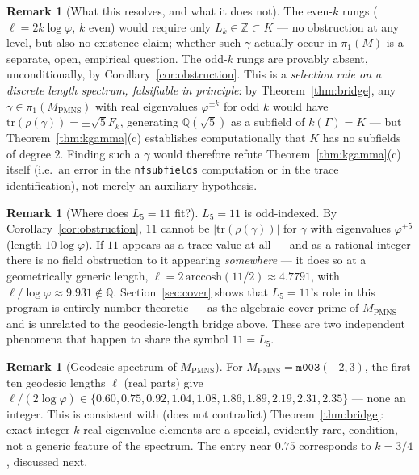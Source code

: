 \documentclass[12pt]{article}
\theoremstyle{definition}
\newtheorem{remark}[theorem]{Remark}
\newcommand{\Z}{\mathbb{Z}}
\newcommand{\Q}{\mathbb{Q}}
\newcommand{\ph}{\varphi}
\newcommand{\logph}{\log\ph}
\newcommand{\tr}{\mathrm{tr}}
\begin{document}
\begin{remark}[What this resolves, and what it does not]
\label{rem:resolution}
The even-$k$ rungs ($\ell=2k\logph$, $k$ even) would require only
$L_k\in\Z\subset K$ --- no obstruction at any level, but also no
existence claim; whether such $\gamma$ actually occur in $\pi_1(M)$ is
a separate, open, empirical question. The odd-$k$ rungs are provably
absent, unconditionally, by Corollary~\ref{cor:obstruction}. This is a
\emph{selection rule on a discrete length spectrum, falsifiable in
principle}: by Theorem~\ref{thm:bridge}, any
$\gamma\in\pi_1(M_{\mathrm{PMNS}})$ with real eigenvalues $\ph^{\pm k}$
for odd $k$ would have $\tr(\rho(\gamma))=\pm\sqrt5F_k$, generating
$\Q(\sqrt5)$ as a subfield of $k(\Gamma)=K$ --- but
Theorem~\ref{thm:kgamma}(c) establishes computationally that $K$ has
no subfields of degree $2$. Finding such a $\gamma$ would therefore
refute Theorem~\ref{thm:kgamma}(c) itself (i.e.\ an error in the
\texttt{nfsubfields} computation or in the trace identification), not
merely an auxiliary hypothesis.
\end{remark}

\begin{remark}[Where does $L_5=11$ fit?]
\label{rem:L5}
$L_5=11$ is odd-indexed. By Corollary~\ref{cor:obstruction}, $11$
cannot be $|\tr(\rho(\gamma))|$ for $\gamma$ with eigenvalues
$\ph^{\pm5}$ (length $10\logph$). If $11$ appears as a trace value at
all --- and as a rational integer there is no field obstruction to it
appearing \emph{somewhere} --- it does so at a geometrically generic
length, $\ell=2\,\mathrm{arccosh}(11/2)\approx4.7791$, with
$\ell/\logph\approx9.931\notin\Q$. Section~\ref{sec:cover} shows that
$L_5=11$'s role in this program is entirely number-theoretic ---
as the algebraic cover prime of $M_{\mathrm{PMNS}}$ --- and is
unrelated to the geodesic-length bridge above. These are two
independent phenomena that happen to share the symbol $11=L_5$.
\end{remark}

\begin{remark}[Geodesic spectrum of $M_{\mathrm{PMNS}}$]
\label{rem:spectrum}
For $M_{\mathrm{PMNS}}=\texttt{m003}(-2,3)$, the first ten geodesic
lengths $\ell$ (real parts) give $\ell/(2\logph)\in
\{0.60,0.75,0.92,1.04,1.08,1.86,1.89,2.19,2.31,2.35\}$ --- none an
integer. This is consistent with (does not contradict)
Theorem~\ref{thm:bridge}: exact integer-$k$ real-eigenvalue elements
are a special, evidently rare, condition, not a generic feature of
the spectrum. The entry near $0.75$ corresponds to $k=3/4$, discussed
next.
\end{remark}
\end{document}
